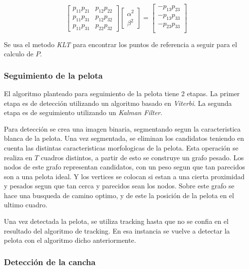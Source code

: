 \documentclass[a4paper,10pt]{article}
\begin{document}
\begin{equation}
\begin{bmatrix}
    p_{1 1} p_{2 1} & p_{1 2} p_{2 2} \\
    p_{1 1} p_{3 1} & p_{1 2} p_{3 2} \\
    p_{1 1} p_{3 1} & p_{2 2} p_{3 2}
\end{bmatrix}
\begin{bmatrix}
    \alpha^2 \\
    \beta^2
\end{bmatrix}
 =
\begin{bmatrix}
    - p_{1 3} p_{2 3} \\
    - p_{1 3} p_{3 3} \\
    - p_{2 3} p_{3 3} \\
\end{bmatrix}
\end{equation}

Se usa el metodo \textit{KLT} \cite{KLT} para encontrar los puntos de referencia a seguir para el calculo de $P$.

\subsubsection*{Seguimiento de la pelota}

El algoritmo planteado para seguimiento de la pelota tiene 2 etapas.
La primer etapa es de detección utilizando un algoritmo basado en \textit{Viterbi}.
La segunda etapa es de seguimiento utilizando un \textit{Kalman Filter}.

Para detección se crea una imagen binaria, segmentando segun la caracteristica blanca de la pelota.
Una vez segmentada, se eliminan los candidatos teniendo en cuenta las distintas caracteristicas morfologicas de la pelota.
Esta operación se realiza en $T$ cuadros distintos, a partir de esto se construye un grafo pesado.
Los nodos de este grafo representan candidatos, con un peso segun que tan parecidos son a una pelota ideal.
Y los vertices se colocan si estan a una cierta proximidad y pesados segun que tan cerca y parecidos sean los nodos.
Sobre este grafo se hace una busqueda de camino optimo, y de este la posición de la pelota en el ultimo cuadro.

Una vez detectada la pelota, se utiliza tracking hasta que no se confia en el resultado del algoritmo de tracking.
En esa instancia se vuelve a detectar la pelota con el algoritmo dicho anteriormente.

\subsubsection*{Detección de la cancha}
\end{document}
